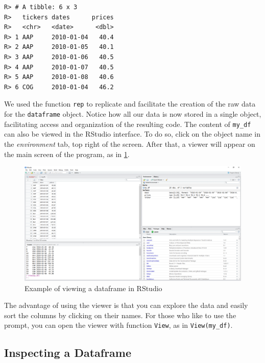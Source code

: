\documentclass[
  12pt,
]{book}
\begin{document}
\begin{verbatim}
R> # A tibble: 6 x 3
R>   tickers dates      prices
R>   <chr>   <date>      <dbl>
R> 1 AAP     2010-01-04   40.4
R> 2 AAP     2010-01-05   40.1
R> 3 AAP     2010-01-06   40.5
R> 4 AAP     2010-01-07   40.5
R> 5 AAP     2010-01-08   40.6
R> 6 COG     2010-01-04   46.2
\end{verbatim}

We used the function \texttt{rep} to replicate and facilitate the creation of the raw data for the \texttt{dataframe} object. Notice how all our data is now stored in a single object, facilitating access and organization of the resulting code. The content of \texttt{my\_df} can also be viewed in the RStudio interface. To do so, click on the object name in the \emph{environment} tab, top right of the screen. After that, a viewer will appear on the main screen of the program, as in \ref{fig:example-view}. 

\begin{figure}[!htbp]

{\centering \includegraphics[width=1\linewidth]{figs/Command_view} 

}

\caption{Example of viewing a dataframe in RStudio}\label{fig:example-view}
\end{figure}

The advantage of using the viewer is that you can explore the data and easily sort the columns by clicking on their names. For those who like to use the prompt, you can open the viewer with function \texttt{View}, as in \texttt{View(my\_df)}. 

\hypertarget{inspecting-a-dataframe}{%
\subsection{Inspecting a Dataframe}\label{inspecting-a-dataframe}}
\end{document}
